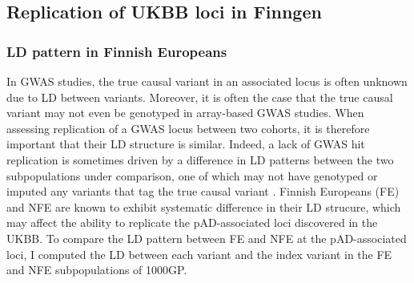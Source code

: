 \subsection{Replication of UKBB loci in Finngen}

\subsubsection{LD pattern in Finnish Europeans}
In GWAS studies, the true causal variant in an associated locus is often unknown due to LD between variants. Moreover, it is often the case that the true causal variant may not even be genotyped in array-based GWAS studies. When assessing replication of a GWAS locus between two cohorts, it is therefore important that their LD structure is similar. Indeed, a lack of GWAS hit replication is sometimes driven by a difference in LD patterns between the two subpopulations under comparison, one of which may not have genotyped or imputed any variants that tag the true causal variant \cite{Kraft2009-xg}. Finnish Europeans (FE) and NFE are known to exhibit systematic difference in their LD strucure, which may affect the ability to replicate the pAD-associated loci discovered in the UKBB. To compare the LD pattern between FE and NFE at the pAD-associated loci, I computed the LD between each variant and the index variant in the FE and NFE subpopulations of 1000GP.\\






